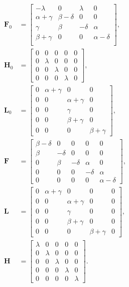 \documentclass[sigconf,draft]{acmart}
\begin{document}
\begin{equation*}
  \begin{split}
  \bm{F}_0 &= \left[\begin{array}{cccc}
-\lambda & 0 & \lambda & 0  \\
\alpha+\gamma & \beta-\delta & 0 & 0  \\
\gamma & \beta & -\delta & \alpha \\
\beta+\gamma & 0 & 0 &\alpha-\delta \\
\end{array}\right], \\
  \bm{H}_0 &= \left[\begin{array}{ccccc}
0 & 0 & 0 & 0 & 0 \\
0& \lambda & 0 & 0 & 0 \\
0 & 0 & \lambda & 0 & 0\\
0 & 0 &  0 & \lambda & 0
\end{array}\right], \\
  \bm{L}_0 &= \left[\begin{array}{cccc}
0 & \alpha+\gamma & 0 & 0 \\
0 & 0 & \alpha+\gamma & 0 \\
0 & 0 & \gamma & 0 \\
0 & 0 & \beta+\gamma & 0\\
0 & 0 & 0 & \beta+\gamma
\end{array}\right], \\
  \bm{F} &= \left[\begin{array}{ccccc}
\beta-\delta & 0 & 0 & 0 & 0 \\
\beta & -\delta & 0 & 0 & 0 \\
0 & \beta & -\delta & \alpha & 0\\
0 & 0 & 0 & -\delta & \alpha \\
0 & 0 &  0 & 0 & \alpha-\delta
\end{array}\right], \\
  \bm{L} &= \left[\begin{array}{ccccc}
0 & \alpha+\gamma & 0 & 0 & 0 \\
0 & 0 & \alpha+\gamma & 0 & 0 \\
0 & 0 & \gamma & 0 & 0 \\
0 & 0 & \beta+\gamma & 0 & 0\\
0 & 0 & 0 & \beta+\gamma & 0
\end{array}\right], \\
  \bm{H} &= \left[\begin{array}{ccccc}
\lambda & 0 & 0 & 0 & 0 \\
0 & \lambda & 0 & 0 & 0 \\
0 & 0 & \lambda & 0 & 0 \\
0 & 0 & 0 & \lambda & 0\\
0 & 0 & 0 & 0 & \lambda
\end{array}\right].
  \end{split}
\end{equation*}
\end{document}
